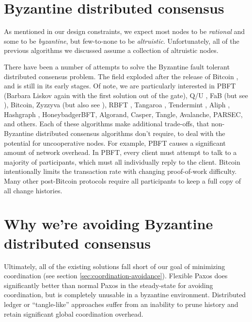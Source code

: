 \documentclass[8pt,fleqn,openany]{book}
\begin{document}
\section{Byzantine distributed consensus}

As mentioned in our design constraints, we expect most nodes to be {\em
rational} and some to be {\em byzantine}, but few-to-none to be {\em
altruistic}. Unfortunately, all of the previous algorithms we discussed assume a
collection of altruistic nodes.

There have been a number of attempts to solve the Byzantine fault tolerant
distributed consensus problem. The field exploded after the release of Bitcoin
\cite{bitcoin}, and is still in its early stages. Of note, we are particularly
interested in PBFT \cite{pbft} (Barbara Liskov again with the
first solution out of the gate), Q/U \cite{qu}, FaB \cite{fab} (but see
\cite{fab-revisited}), Bitcoin, Zyzzyva \cite{zyzzyva} (but also
see \cite{fab-revisited}), RBFT \cite{rbft}, Tangaroa \cite{tangaroa},
Tendermint \cite{tendermint}, Aliph \cite{aliph}, Hashgraph \cite{hashgraph},
HoneybadgerBFT\cite{honeybadger}, Algorand\cite{algorand}, Casper\cite{casper},
Tangle\cite{tangle}, Avalanche\cite{avalanche}, PARSEC\cite{parsec}, and
others\cite{mickens-bft}.
Each of these algorithms make
additional trade-offs, that non-Byzantine distributed consensus algorithms don't
require, to deal with the potential for uncooperative nodes. For example,
PBFT \cite{pbft} causes a significant amount of network overhead. In PBFT, every
client must attempt to talk to a majority of participants, which must all
individually reply to the client. Bitcoin
\cite{bitcoin} intentionally limits the transaction rate with changing
proof-of-work difficulty. Many other post-Bitcoin protocols require all
participants to keep a full copy of all change histories.

\section{Why we're avoiding Byzantine distributed consensus}

Ultimately, all of the existing solutions fall short of our goal of minimizing
coordination (see section \ref{sec:coordination-avoidance}). Flexible Paxos
\cite{paxos-flexible} does significantly better than normal Paxos in the
steady-state for avoiding coordination, but is completely unusable in a
byzantine environment. Distributed ledger or ``tangle-like'' approaches suffer
from an inability to prune history and retain significant global coordination
overhead.
\end{document}
